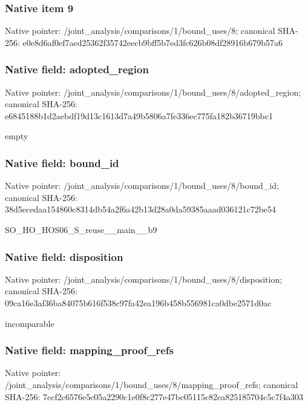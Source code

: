 \documentclass[10pt,a4paper]{article}
\begin{document}
\subsubsection{Native item 9}
Native pointer: /joint\_\allowbreak{}analysis/comparisons/1/bound\_\allowbreak{}uses/8; canonical SHA-256: e0e8d6af0ef7aed25362f35742eecb9bff5b7ed3fc626b08df28916b679b57a6

\subsubsection{Native field: adopted\_\allowbreak{}region}
Native pointer: /joint\_\allowbreak{}analysis/comparisons/1/bound\_\allowbreak{}uses/8/adopted\_\allowbreak{}region; canonical SHA-256: e6845188b1d2aebdf19d13c1613d7a49b5806a7fe336ec775fa182b36719bbc1

\begingroup\raggedright\sloppy empty\par\endgroup

\subsubsection{Native field: bound\_\allowbreak{}id}
Native pointer: /joint\_\allowbreak{}analysis/comparisons/1/bound\_\allowbreak{}uses/8/bound\_\allowbreak{}id; canonical SHA-256: 38d5ecedaa154860c8314db54a2f6a42b13d28a0da59385aaad036121c72be54

\begingroup\raggedright\sloppy SO\_\allowbreak{}HO\_\allowbreak{}HOS06\_\allowbreak{}S\_\allowbreak{}reuse\_\allowbreak{}\_\allowbreak{}main\_\allowbreak{}\_\allowbreak{}b9\par\endgroup

\subsubsection{Native field: disposition}
Native pointer: /joint\_\allowbreak{}analysis/comparisons/1/bound\_\allowbreak{}uses/8/disposition; canonical SHA-256: 09ca16e3af36ba84075b616f538c97fa42ea196b458b556981ca0dbe2571d0ac

\begingroup\raggedright\sloppy incomparable\par\endgroup

\subsubsection{Native field: mapping\_\allowbreak{}proof\_\allowbreak{}refs}
Native pointer: /joint\_\allowbreak{}analysis/comparisons/1/bound\_\allowbreak{}uses/8/mapping\_\allowbreak{}proof\_\allowbreak{}refs; canonical SHA-256: 7ecf2c6576e5c05a2290c1e0f8c277e47bc05115c82ea825185704c5c7f4a303
\end{document}

